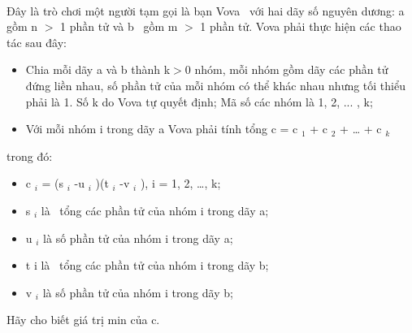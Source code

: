  

Đây là trò chơi một người tạm gọi là bạn Vova  với hai dãy số nguyên dương: a gồm n $>$ 1 phần tử và b  gồm m $>$ 1 phần tử. Vova phải thực hiện các thao tác sau đây:
\begin{itemize}
	\item Chia mỗi dãy a và b thành k$>$0 nhóm, mỗi nhóm gồm dãy các phần tử đứng liền nhau, số phần tử của mỗi nhóm có thể khác nhau nhưng tối thiểu phải là 1. Số k do Vova tự quyết định; Mã số các nhóm là 1, 2, ... , k;
	\item Với mỗi nhóm i trong dãy a Vova phải tính tổng c = c $_ 1 $ + c $_ 2 $ + … + c $_ k $
\end{itemize}

trong đó:
\begin{itemize}
	\item c $_ i $ = (s $_ i $ -u $_ i $ )(t $_ i $ -v $_ i $ ), i = 1, 2, …, k;
	\item s $_ i $ là  tổng các phần tử của nhóm i trong dãy a;
	\item u $_ i $ là số phần tử của nhóm i trong dãy a;
	\item t i là  tổng các phần tử của nhóm i trong dãy b;
	\item v $_ i $ là số phần tử của nhóm i trong dãy b;
\end{itemize}

Hãy cho biết giá trị min của c.

\